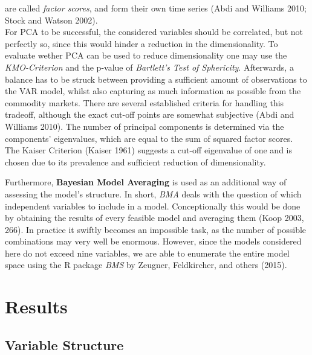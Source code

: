 \documentclass[12pt,]{article}
\begin{document}
are called \emph{factor scores}, and form their own time series (Abdi
and Williams 2010; Stock and Watson 2002).\\
For PCA to be successful, the considered variables should be correlated,
but not perfectly so, since this would hinder a reduction in the
dimensionality. To evaluate wether PCA can be used to reduce
dimensionality one may use the \emph{KMO-Criterion} and the p-value of
\emph{Bartlett's Test of Sphericity}. Afterwards, a balance has to be
struck between providing a sufficient amount of observations to the VAR
model, whilst also capturing as much information as possible from the
commodity markets. There are several established criteria for handling
this tradeoff, although the exact cut-off points are somewhat subjective
(Abdi and Williams 2010). The number of principal components is
determined via the components' eigenvalues, which are equal to the sum
of squared factor scores. The Kaiser Criterion (Kaiser 1961) suggests a
cut-off eigenvalue of one and is chosen due to its prevalence and
sufficient reduction of dimensionality.

Furthermore, \textbf{Bayesian Model Averaging} is used as an additional
way of assessing the model's structure. In short, \emph{BMA} deals with
the question of which independent variables to include in a model.
Conceptionally this would be done by obtaining the results of every
feasible model and averaging them (Koop 2003, 266). In practice it
swiftly becomes an impossible task, as the number of possible
combinations may very well be enormous. However, since the models
considered here do not exceed nine variables, we are able to enumerate
the entire model space using the R package \emph{BMS} by Zeugner,
Feldkircher, and others (2015).

\section{Results}\label{results}

\subsection{Variable Structure}\label{variable-structure}
\end{document}
